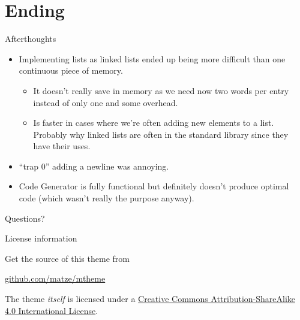 \documentclass[10pt]{beamer}
\begin{document}
\section{Ending}
\begin{frame}{Afterthoughts}
    \begin{itemize}
        \item Implementing lists as linked lists ended up being more difficult than one continuous piece of memory.
        \begin{itemize}
            \item It doesn't really save in memory as we need now two words per entry instead of only one and some overhead.
            \item Is faster in cases where we're often adding new elements to a list. Probably why linked lists are often in the standard library since they have their uses.
        \end{itemize}
        \item ``trap 0'' adding a newline was annoying.
        \item Code Generator is fully functional but definitely doesn't produce optimal code (which wasn't really the purpose anyway).
    \end{itemize}
\end{frame}

{
\begin{frame}[standout]
  Questions?
\end{frame}
}

\begin{frame}{License information}

  Get the source of this theme from

  \begin{center}\url{github.com/matze/mtheme}\end{center}

  The theme \emph{itself} is licensed under a
  \href{http://creativecommons.org/licenses/by-sa/4.0/}{Creative Commons
  Attribution-ShareAlike 4.0 International License}.

  \begin{center}\ccbysa\end{center}

\end{frame}
\end{document}
